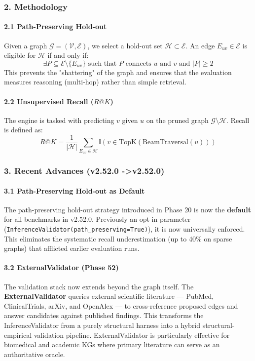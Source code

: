 \subsubsection{2. Methodology}

\paragraph{2.1 Path-Preserving Hold-out}
Given a graph $\mathcal{G} = (\mathcal{V}, \mathcal{E})$, we select a hold-out set $\mathcal{H} \subset \mathcal{E}$. An edge $E_{uv} \in \mathcal{E}$ is eligible for $\mathcal{H}$ if and only if:
\begin{equation}
\exists P \subseteq \mathcal{E} \setminus \{E_{uv}\} \text{ such that } P \text{ connects } u \text{ and } v \text{ and } |P| \geq 2
\end{equation}
This prevents the "shattering" of the graph and ensures that the evaluation measures reasoning (multi-hop) rather than simple retrieval.

\paragraph{2.2 Unsupe\-rvised Recall ($R@K$)}
The engine is tasked with predicting $v$ given $u$ on the pruned graph $\mathcal{G} \setminus \mathcal{H}$. Recall is defined as:
\begin{equation}
R@K = \frac{1}{|\mathcal{H}|} \sum_{E_{uv} \in \mathcal{H}} \mathbb{I}(v \in \text{TopK}(\text{BeamTraversal}(u)))
\end{equation}

\subsubsection{3. Recent Advances (v2.52.0 -\textgreater  v2.52.0)}

\paragraph{3.1 Path-Preserving Hold-out as Default}
The path-preserving hold-out strategy introduced in Phase 20 is now the \textbf{default} for all benchmarks in v2.52.0. Previously an opt-in parameter (\texttt{InferenceValidator(path\_preserving=True)}), it is now universally enforced. This eliminates the systematic recall under\-estimation (up to 40\% on sparse graphs) that afflicted earlier evaluation runs.

\paragraph{3.2 ExternalValidator (Phase 52)}
The validation stack now extends beyond the graph itself. The \textbf{ExternalValidator} queries external scientific literature — PubMed, ClinicalTrials, arXiv, and OpenAlex — to cross-reference proposed edges and answer candidates against published findings. This transforms the InferenceValidator from a purely structural harness into a hybrid structural-empirical validation pipeline. ExternalValidator is parti\-cularly effective for biomedical and academic KGs where primary literature can serve as an autho\-ritative oracle.

